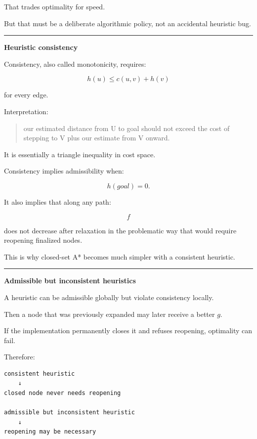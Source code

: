 That trades optimality for speed.

But that must be a deliberate algorithmic policy, not an accidental heuristic bug.

\begin{center}\rule{0.5\linewidth}{0.5pt}\end{center}

\textbf{Heuristic consistency}

Consistency, also called monotonicity, requires:

\[
\boxed{
h(u)
\le
c(u,v)+h(v)
}
\]

for every edge.

Interpretation:

\begin{quote}
our estimated distance from U to goal should not exceed the cost of stepping to V plus our estimate from V onward.
\end{quote}

It is essentially a triangle inequality in cost space.

Consistency implies admissibility when:

\[
h(goal)=0.
\]

It also implies that along any path:

\[
f
\]

does not decrease after relaxation in the problematic way that would require reopening finalized nodes.

This is why closed-set A* becomes much simpler with a consistent heuristic.

\begin{center}\rule{0.5\linewidth}{0.5pt}\end{center}

\textbf{Admissible but inconsistent heuristics}

A heuristic can be admissible globally but violate consistency locally.

Then a node that was previously expanded may later receive a better \(g\).

If the implementation permanently closes it and refuses reopening, optimality can fail.

Therefore:

\begin{verbatim}
consistent heuristic
    ↓
closed node never needs reopening

admissible but inconsistent heuristic
    ↓
reopening may be necessary
\end{verbatim}

